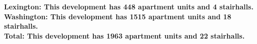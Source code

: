 \bf{Lexington}: This development has 448 apartment units and 4 stairhalls.\\\bf{Washington}: This development has 1515 apartment units and 18 stairhalls.\\\bf{Total}: This development has 1963 apartment units and 22 stairhalls.\\